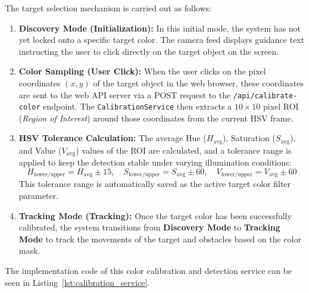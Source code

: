 The target selection mechanism is carried out as follows:
\begin{enumerate}
    \item \textbf{Discovery Mode (Initialization):} In this initial mode, the system has not yet locked onto a specific target color. The camera feed displays guidance text instructing the user to click directly on the target object on the screen.
    \item \textbf{Color Sampling (User Click):} When the user clicks on the pixel coordinates $(x, y)$ of the target object in the web browser, these coordinates are sent to the web API server via a POST request to the \texttt{/api/calibrate-color} endpoint. The \texttt{CalibrationService} then extracts a $10 \times 10$ pixel ROI (\textit{Region of Interest}) around those coordinates from the current HSV frame.
    \item \textbf{HSV Tolerance Calculation:} The average Hue ($H_{\text{avg}}$), Saturation ($S_{\text{avg}}$), and Value ($V_{\text{avg}}$) values of the ROI are calculated, and a tolerance range is applied to keep the detection stable under varying illumination conditions:
    \begin{equation}
        H_{\text{lower/upper}} = H_{\text{avg}} \pm 15, \quad S_{\text{lower/upper}} = S_{\text{avg}} \pm 60, \quad V_{\text{lower/upper}} = V_{\text{avg}} \pm 60
    \end{equation}
    This tolerance range is automatically saved as the active target color filter parameter.
    \item \textbf{Tracking Mode (Tracking):} Once the target color has been successfully calibrated, the system transitions from \textbf{Discovery Mode} to \textbf{Tracking Mode} to track the movements of the target and obstacles based on the color mask.
\end{enumerate}

The implementation code of this color calibration and detection service can be seen in Listing~\ref{lst:calibration_service}.

